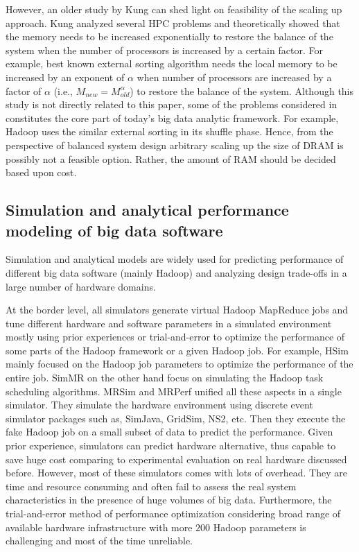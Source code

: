 \documentclass[journal]{IEEEtran}
\begin{document}
However, an older study by Kung \cite{Balance:kung1986memory} can shed light on feasibility of the scaling up approach. Kung analyzed several HPC problems and theoretically showed that the memory needs to be increased exponentially to restore the balance of the system when the number of processors is increased by a certain factor. For example, best known external sorting algorithm needs the local memory to be increased by an exponent of $\alpha$ when number of processors are increased by a factor of  $\alpha$ (i.e., $M_{new} = M_{old}^{\alpha}$) to restore the balance of the system. Although this study is not directly related to this paper, some of the problems considered in \cite{Balance:kung1986memory} constitutes the core part of today's big data analytic framework. For example, Hadoop uses the similar external sorting in its shuffle phase. Hence, from the perspective of balanced system design arbitrary scaling up the size of DRAM is possibly not a feasible option. Rather, the amount of RAM should be decided based upon cost.

\subsection{Simulation and analytical performance modeling of big data software}
Simulation and analytical models are widely used for predicting performance of different big data software (mainly Hadoop) and analyzing design trade-offs in a large number of hardware domains. 

At the border level, all simulators generate virtual Hadoop MapReduce jobs and tune different hardware and software parameters in a simulated environment mostly using prior experiences or trial-and-error to optimize the performance of some parts of the Hadoop framework or a given Hadoop job. For example, HSim \cite{Simulator:liu2013hsim} mainly focused on the Hadoop job parameters to optimize the performance of the entire job. SimMR \cite{Simulator:verma2011play} on the other hand focus on simulating the Hadoop task scheduling algorithms. MRSim\cite{Simulator:hammoud2010mrsim} and MRPerf \cite{Simulator:wang2009simulation} unified all these aspects in a single simulator. They simulate the hardware environment using discrete event simulator packages such as,  SimJava, GridSim, NS2, etc. Then  they execute the fake Hadoop job on a small subset of data to predict the performance. Given prior experience, simulators can predict hardware alternative, thus capable to save huge cost comparing to experimental evaluation on real hardware discussed before. However, most of these simulators comes with lots of overhead. They are time and resource consuming and often fail to assess the real system characteristics in the presence of huge volumes of big data. Furthermore, the trial-and-error method of performance optimization considering broad range of available hardware infrastructure with more $200$ Hadoop parameters is challenging and most of the time unreliable.
\end{document}
